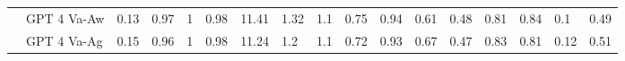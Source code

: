 \begin{table*}[t]
{\begin{tabular}{@{}ll|llll|llll|lll|ll|ll@{}}
                           & GPT 4 Va-Aw          & 0.13                                                                    & 0.97                                                                     & 1                                                                     & 0.98                                                                  & 11.41                                                                   & 1.32                                                                  & 1.1                                                                   & 0.75                                                                   & 0.94                                                                    & 0.61                                                                  & 0.48                                                                   & 0.81                                                                   & 0.84                                                                   & 0.1                                                                      & 0.49                                                                     \\
                           & GPT 4 Va-Ag          & 0.15                                                                    & 0.96                                                                     & 1                                                                     & 0.98                                                                  & 11.24                                                                   & 1.2                                                                   & 1.1                                                                   & 0.72                                                                   & 0.93                                                                    & 0.67                                                                  & 0.47                                                                   & 0.83                                                                   & 0.81                                                                   & 0.12                                                                     & 0.51                                                                     \\ \midrule

\end{tabular}}
\end{table*}
